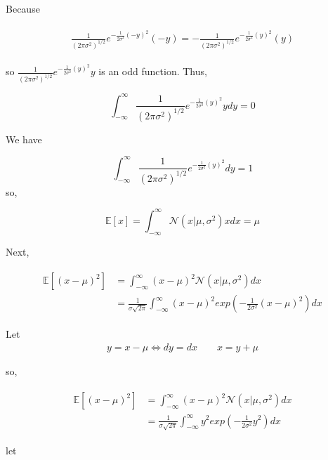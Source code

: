 Because

\begin{align}
    \begin{split}
        \frac{1}{(2\pi \sigma ^2)^{1/2}} e^{-\frac{1}{2\sigma^2}(-y)^2}(-y) = - \frac{1}{(2\pi \sigma ^2)^{1/2}} e^{-\frac{1}{2\sigma^2}(y)^2}(y)
    \end{split}
\end{align}

so $\frac{1}{(2\pi \sigma ^2)^{1/2}} e^{-\frac{1}{2\sigma^2}(y)^2}y$ is an odd function. Thus,


$$
    \int_{- \infty}^{\infty} \frac{1}{(2\pi \sigma ^2)^{1/2}} e^{-\frac{1}{2\sigma^2}(y)^2}ydy = 0
$$

We have

$$
    \int_{- \infty}^{\infty} \frac{1}{(2\pi \sigma ^2)^{1/2}} e^{-\frac{1}{2\sigma^2}(y)^2}dy = 1
$$
so,

\begin{equation}
    \mathbb{E}[x] = \int_{- \infty}^{\infty} \mathcal{N}(x | \mu, \sigma^2)xdx = \mu
\end{equation}

Next,

\begin{align}
    \begin{split}
        \mathbb{E}[(x - \mu)^2] & = \int_{- \infty}^{\infty} (x - \mu)^2 \mathcal{N}(x | \mu, \sigma^2)dx\\
        & = \frac{1}{\sigma\sqrt{2\pi}}\int_{- \infty}^{\infty} (x - \mu)^2 exp(- \frac{1}{2 \sigma^2}(x - \mu)^2)dx
    \end{split}
\end{align}

Let
\begin{align}
        y = x - \mu \Leftrightarrow dy = dx  \qquad    x = y + \mu
\end{align}

so,

\begin{align}
    \begin{split}
        \mathbb{E}[(x - \mu)^2] & = \int_{- \infty}^{\infty} (x - \mu)^2 \mathcal{N}(x | \mu, \sigma^2)dx\\
        & = \frac{1}{\sigma\sqrt{2\pi}}\int_{- \infty}^{\infty} y^2 exp(- \frac{1}{2 \sigma^2}y^2)dx
    \end{split}
\end{align}

let

